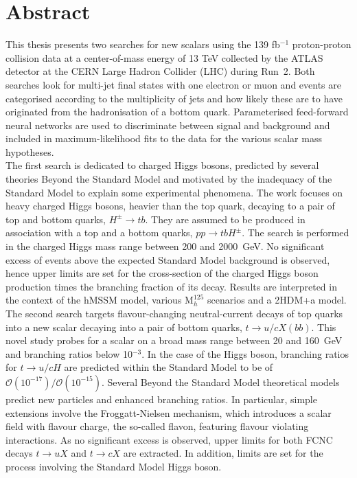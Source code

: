 \chapter*{Abstract}

This thesis presents two searches for new scalars using the 139 fb$^{-1}$ proton-proton collision data at a center-of-mass energy of 13 TeV collected by the ATLAS detector at the CERN Large Hadron Collider (LHC) during Run~2. Both searches look for multi-jet final states with one electron or muon and events are categorised according to the multiplicity of jets and how likely these are to have originated from the hadronisation of a bottom quark. Parameterised feed-forward neural networks are used to discriminate between signal and background and included in maximum-likelihood fits to the data for the various scalar mass hypotheses.\\

The first search is dedicated to charged Higgs bosons, predicted by several theories Beyond the Standard Model and motivated by the inadequacy of the Standard Model to explain some experimental phenomena. The work focuses on heavy charged Higgs bosons, heavier than the top quark, decaying to a pair of top and bottom quarks, $H^\pm\to tb$. They are assumed to be produced in association with a top and a bottom quarks, $pp\to tbH^\pm$. The search is performed in the charged Higgs mass range between 200 and 2000~GeV. No significant excess of events above the expected Standard Model background is observed, hence upper limits are set for the cross-section of the charged Higgs boson production times the branching fraction of its decay. Results are interpreted in the context of the hMSSM model, various $\text{M}_h^{125}$ scenarios and a 2HDM+a model.\\

The second search targets flavour-changing neutral-current decays of top quarks into a new scalar decaying into a pair of bottom quarks, $t \to u/c X(bb)$. This novel study probes for a scalar on a broad mass range between 20 and 160~GeV and branching ratios below 10$^{-3}$. In the case of the Higgs boson, branching ratios for $t \to u/c H$ are predicted within the Standard Model to be of $\mathcal{O}(10^{-17})/\mathcal{O}(10^{-15})$. Several Beyond the Standard Model theoretical models predict new particles and enhanced branching ratios. In particular, simple extensions involve the Froggatt-Nielsen mechanism, which introduces a scalar field with flavour charge, the so-called flavon, featuring flavour violating interactions. As no significant excess is observed, upper limits for both FCNC decays $t\to uX$ and $t\to cX$ are extracted. In addition, limits are set for the process involving the Standard Model Higgs boson.
